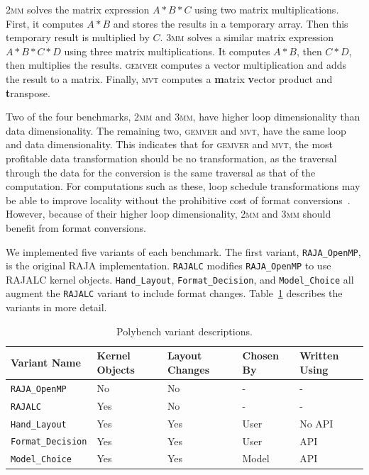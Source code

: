 \documentclass[sigconf]{acmart}
\begin{document}
\textsc{2mm} solves the matrix expression $A*B*C$ using two matrix multiplications. 
First, it computes $A*B$ and stores the results in a temporary array.
Then this temporary result is multiplied by $C$.
\textsc{3mm} solves a similar matrix expression $A*B*C*D$ using three matrix multiplications.
It computes $A*B$, then $C*D$, then multiplies the results.
\textsc{gemver} computes a vector multiplication and adds the result to a matrix. 
Finally, \textsc{mvt} computes a \textbf{m}atrix \textbf{v}ector product and \textbf{t}ranspose.

Two of the four benchmarks, \textsc{2mm} and \textsc{3mm}, have higher loop dimensionality than data dimensionality. 
The remaining two, \textsc{gemver} and \textsc{mvt}, have the same loop and data dimensionality. 
This indicates that for \textsc{gemver} and \textsc{mvt}, the most profitable data transformation should be no transformation, as the traversal through the data for the conversion is the same traversal as that of the computation.
For computations such as these, loop schedule transformations may be able to improve locality without the prohibitive cost of format conversions~\cite{kandemir1998improving}.
However, because of their higher loop dimensionality, \textsc{2mm} and \textsc{3mm} should benefit from format conversions.

We implemented five variants of each benchmark.
The first variant, \verb.RAJA_OpenMP., is the original RAJA implementation.
\verb.RAJALC. modifies \verb.RAJA_OpenMP. to use RAJALC kernel objects.
\verb.Hand_Layout., \verb.Format_Decision., and \verb.Model_Choice. all augment the \verb.RAJALC. variant to include format changes.
Table~\ref{VariantDescription} describes the variants in more detail.

\begin{table}
	\centering
	\begin{tabular}{ p{2.4cm} | p{1.1cm} | p{1.1cm} | p{1cm} | p{1cm}}
		 \raggedright Variant \linebreak Name & \raggedright Kernel Objects & \raggedright Layout Changes & \raggedright Chosen By &  Written Using \tabularnewline
		\hline
		\verb.RAJA_OpenMP. & No & No & - & - \\
		\verb.RAJALC. & Yes & No & - & - \\
		\verb.Hand_Layout. & Yes & Yes & User & No API \\
		\verb.Format_Decision. & Yes & Yes & User & API \\
		\verb.Model_Choice. & Yes & Yes & Model & API
	\end{tabular}
	\caption{Polybench variant descriptions.}
	\label{VariantDescription}
\end{table}
\end{document}
